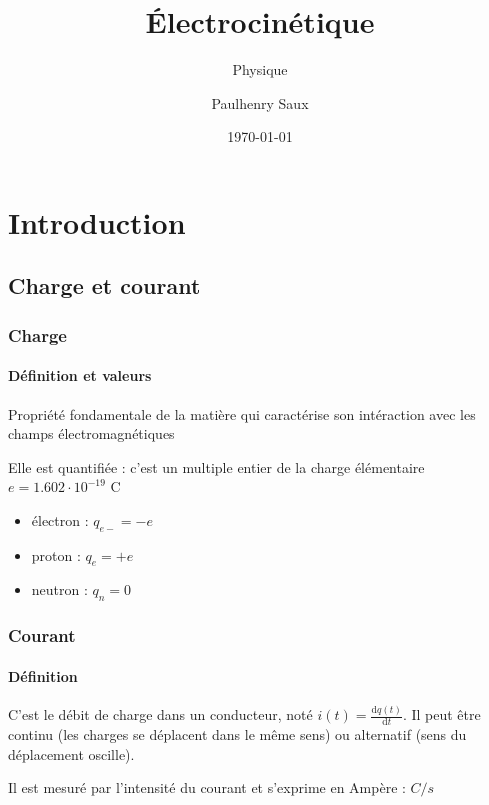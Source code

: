 \documentclass[french]{yLectureNote}
\title{Électrocinétique}
\subtitle{Physique}
\author{Paulhenry Saux}
\date{\today}
\renewcommand{\vec}{\overrightarrow}
\begin{document}
	\chapter{Introduction}
\section{Charge et courant}
\subsection{Charge}
\subsubsection{Définition et valeurs}
\begin{definition}
Propriété fondamentale de la matière qui caractérise son intéraction avec les champs électromagnétiques
\end{definition}
Elle est quantifiée : c'est un multiple entier de la charge élémentaire \(e  = 1.602\cdot 10^{-19}\) C
\begin{itemize}
 \item électron : $q_{e-} = -e$
 \item proton : $q_{e} = +e$
 \item neutron : $q_n = 0$
\end{itemize}
\subsection{Courant}
\subsubsection{Définition}
\begin{definition}[Courant]
C'est le débit de charge dans un conducteur, noté \(i(t) = \frac{\mathrm{d} q(t)}{\mathrm{d}t}\). Il peut \^etre continu (les charges se déplacent dans le m\^eme sens) ou alternatif (sens du déplacement oscille).
\end{definition}
Il est mesuré par l'intensité du courant et s'exprime en Ampère : $C/s$
\end{document}
